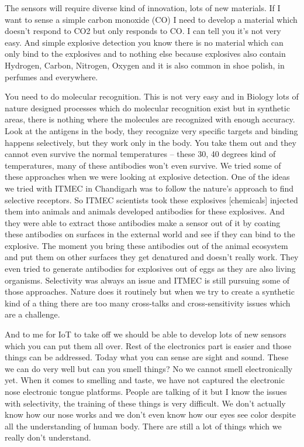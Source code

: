 \begin{multicols}{2}
The sensors will require diverse kind of innovation, lots of new materials. If I want to sense a simple carbon monoxide (CO) I need to develop a material which doesn’t respond to CO2 but only responds to CO. I can tell you it’s not very easy.  And simple explosive detection you know there is no material which can only bind to the explosives and to nothing else because explosives also contain Hydrogen, Carbon, Nitrogen, Oxygen and it is also common in shoe polish, in perfumes and everywhere.

You need to do molecular recognition. This is not very easy and in Biology lots of nature designed processes which do molecular recognition exist but in synthetic areas, there is nothing where the molecules are recognized with enough accuracy.  Look at the antigens in the body, they recognize very specific targets and binding happens selectively, but they work only in the body. You take them out and they cannot even survive the normal temperatures -- these 30, 40 degrees kind of temperatures, many of these antibodies won’t even survive. We tried some of these approaches when we were looking at explosive detection. One of the ideas we tried with ITMEC in Chandigarh was to follow the nature’s approach to find selective receptors. So ITMEC scientists took these explosives [chemicals] injected them into animals and animals developed antibodies for these explosives. And they were able to extract those antibodies make a sensor out of it by coating these antibodies on surfaces in the external world and see if they can bind to the explosive.  The moment you bring these antibodies out of the animal ecosystem and put them on other surfaces they get denatured and doesn’t really work. They even tried to generate antibodies for explosives out of eggs as they are also living organisms.  Selectivity was always an issue and ITMEC is still pursuing some of those approaches. Nature does it routinely but when we try to create a synthetic kind of a thing there are too many cross-talks and cross-sensitivity issues which are a challenge.

And to me for IoT to take off we should be able to develop lots of new sensors which you can put them all over. Rest of the electronics part is easier and those things can be addressed. Today what you can sense are sight and sound. These we can do very well but can you smell things? No we cannot smell electronically yet. When it comes to smelling and taste, we have not captured the electronic nose electronic tongue platforms.  People are talking of it but I know the issues with selectivity, the training of these things is very difficult. We don’t actually know how our nose works and we don’t even know how our eyes see color despite all the understanding of human body. There are still a lot of things which we really don’t understand.


\end{multicols}
